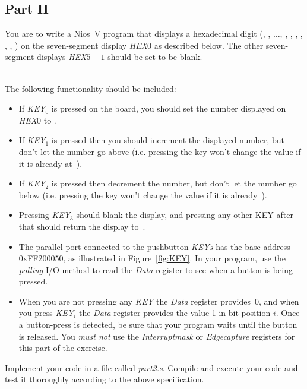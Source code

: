 \documentclass[epsfig,10pt,fullpage]{article}
\begin{document}
\subsection*{Part II}

\noindent
You are to write a Nios~V program that displays a hexadecimal digit 
(, , $\ldots$, , , , , , , ) on the 
seven-segment display {\it HEX}0 as described below. The other seven-segment 
displays {\it HEX}$5-1$ should be set to be blank.  

~\\
\noindent
The following functionality should be included:

\begin{itemize}
\item If {\it KEY}$_0$ is pressed on the board, you should set the number displayed on 
{\it HEX}0 to . 
\item If {\it KEY}$_1$ is pressed then you should increment the displayed number, 
but don't let the number go above  (i.e. pressing the key won't change the value if 
it is already at $\,$).
\item If {\it KEY}$_2$ is pressed then decrement the number, but don't
let the number go below  (i.e. pressing the key won't change the value if it is
already $\,$). 
\item Pressing {\it KEY}$_3$ should 
blank the display, and pressing any other KEY after that should return the display to~.
\item
The parallel port connected to the pushbutton {\it KEYs} has the base address
{\sf 0xFF200050}, as illustrated in Figure~\ref{fig:KEY}. In your program, use 
the \emph{polling} I/O method to read the {\it Data} register to see when a button 
is being pressed. 
\item When you are not pressing 
any {\it KEY} the {\it Data} register provides~0, and when you press {\it KEY}$_i$ the 
{\it Data} register provides the value 1 in bit position $i$. Once a button-press is detected,
be sure that your program waits until the button is released. You \emph{must not} use the 
{\it Interruptmask} or {\it Edgecapture} registers for this part of the exercise.
\end{itemize}

\noindent
Implement your code in a file called {\it part2.s}. Compile and execute your code and test
it thoroughly according to the above specification. 
\end{document}
